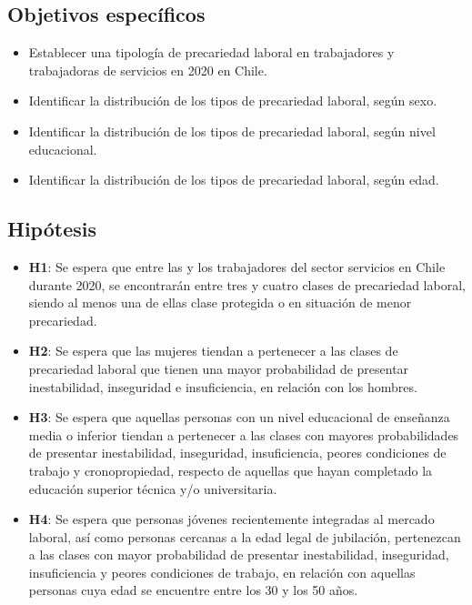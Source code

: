 \documentclass[
]{article}
\begin{document}
\hypertarget{objetivos-especuxedficos}{%
\subsection{Objetivos específicos}\label{objetivos-especuxedficos}}

\begin{itemize}
\item
  Establecer una tipología de precariedad laboral en trabajadores y
  trabajadoras de servicios en 2020 en Chile.
\item
  Identificar la distribución de los tipos de precariedad laboral, según
  sexo.
\item
  Identificar la distribución de los tipos de precariedad laboral, según
  nivel educacional.
\item
  Identificar la distribución de los tipos de precariedad laboral, según
  edad.
\end{itemize}

\hypertarget{hipuxf3tesis}{%
\subsection{Hipótesis}\label{hipuxf3tesis}}

\begin{itemize}
\item
  \textbf{H1}: Se espera que entre las y los trabajadores del sector
  servicios en Chile durante 2020, se encontrarán entre tres y cuatro
  clases de precariedad laboral, siendo al menos una de ellas clase
  protegida o en situación de menor precariedad.
\item
  \textbf{H2}: Se espera que las mujeres tiendan a pertenecer a las
  clases de precariedad laboral que tienen una mayor probabilidad de
  presentar inestabilidad, inseguridad e insuficiencia, en relación con
  los hombres.
\item
  \textbf{H3}: Se espera que aquellas personas con un nivel educacional
  de enseñanza media o inferior tiendan a pertenecer a las clases con
  mayores probabilidades de presentar inestabilidad, inseguridad,
  insuficiencia, peores condiciones de trabajo y cronopropiedad,
  respecto de aquellas que hayan completado la educación superior
  técnica y/o universitaria.
\item
  \textbf{H4}: Se espera que personas jóvenes recientemente integradas
  al mercado laboral, así como personas cercanas a la edad legal de
  jubilación, pertenezcan a las clases con mayor probabilidad de
  presentar inestabilidad, inseguridad, insuficiencia y peores
  condiciones de trabajo, en relación con aquellas personas cuya edad se
  encuentre entre los 30 y los 50 años.
\end{itemize}
\end{document}
